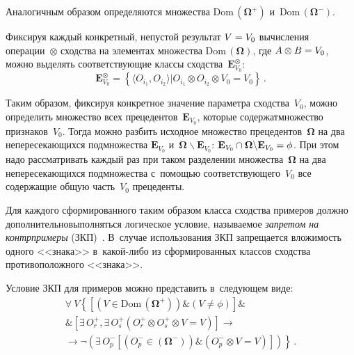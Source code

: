 \begin{multicols}{2}
  Аналогичным образом определяются множества 
$\mathrm{Dom}\,(\boldsymbol{\Omega}^+)$ и~$\mathrm{Dom}\,(\boldsymbol{\Omega}^-)$. 
  
  Фиксируя каждый конкретный, непустой результат $V\hm=V_0$ вычисления 
операции~$\otimes$ сходства на элементах множества 
$\mathrm{Dom}\,(\boldsymbol{\Omega})$, где $A\otimes B\hm= V_0$, можно выделять 
соответствующие классы сходства~$\mathbf{E}^{\otimes}_{V_0}$: 
  $$
  \mathbf{E}^{\otimes}_{V_0}=\left\{ \langle O_{i_1}, O_{i_2} \rangle \vert 
O_{i_1} \otimes O_{i_2}\otimes V_0=V_0\right\}\,.
  $$
  
   
  
  Таким образом, фиксируя конкретное значение параметра сходства~$V_0$, 
можно определить множество всех прецедентов~$\mathbf{E}_{V_0}$, которые 
содержат\linebreak множество признаков~$V_0$. Тогда можно разбить исходное множество 
прецедентов~$\boldsymbol{\Omega}$ на два непересекающихся подмножества 
$\mathbf{E}_{V_0}$ и~$\boldsymbol{\Omega}\backslash \mathbf{E}_{V_0}$: 
$\mathbf{E}_{V_0}\cap \boldsymbol{\Omega}\backslash 
\mathbf{E}_{V_0}\hm=\phi$.
  При этом надо рассматривать каж\-дый раз при таком разделении 
множества~$\boldsymbol{\Omega}$ на два не\-пе\-ре\-се\-ка\-ющих\-ся подмножества 
с~по\-мощью соответствующего~$V_0$ все содержащие общую часть~$V_0$ 
прецеденты. 
  
  Для каждого сформированного таким образом класса сходства примеров 
должно дополнительно\linebreak выполняться логическое условие, называемое 
\textit{запретом на контрпримеры} (ЗКП)~\cite{9-gr}. В~случае использования 
ЗКП запрещается вложимость одного <<знака>> в~ка\-кой-ли\-бо из 
сформированных классов сходства противоположного <<знака>>.
  
  Условие ЗКП для примеров можно представить в~следующем виде:
    \begin{multline*}
  \forall\ V \left\{ \left[ \left(V\in \mathrm{Dom}\,
  \left(\boldsymbol{\Omega}^+\right)\right)\& (V\not= \phi) \right]
\&\right.\\
\&
\left[ \exists\,O_r^+, \exists\,O_s^+  \left( O_r^+\otimes O_s^+\otimes 
V=V\right)\right]\to\\
  \left. {}\to \neg \left( \exists\,O_p^- \left[
  \left(O_p^-\in (\boldsymbol{\Omega}^-)\right)\& 
  \left(O_p^-
\otimes V=V\right)\right]\right)\right\}\,.
  \end{multline*}
% 




\end{multicols}
